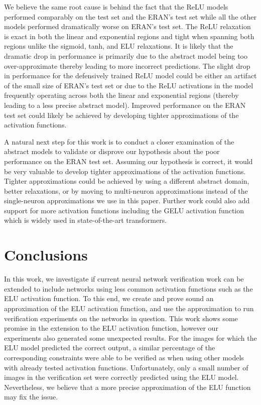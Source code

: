 \documentclass{llncs}
\begin{document}
We believe the same root cause is behind the fact that the ReLU models performed comparably on the test set and the ERAN's test set while all the other models performed dramatically worse on ERAN's test set.
The ReLU relaxation is exact in both the linear and exponential regions and tight when spanning both regions unlike the sigmoid, tanh, and ELU relaxations.
It is likely that the dramatic drop in performance is primarily due to the abstract model being too over-approximate thereby leading to more incorrect predictions.
The slight drop in performance for the defensively trained ReLU model could be either an artifact of the small size of ERAN's test set or due to the ReLU activations in the model frequently operating across both the linear and exponential regions (thereby leading to a less precise abstract model).
Improved performance on the ERAN test set could likely be achieved by developing tighter approximations of the activation functions.

A natural next step for this work is to conduct a closer examination of the abstract models to validate or disprove our hypothesis about the poor performance on the ERAN test set.
Assuming our hypothesis is correct, it would be very valuable to develop tighter approximations of the activation functions.
Tighter approximations could be achieved by using a different abstract domain, better relaxations, or by moving to multi-neuron approximations instead of the single-neuron approximations we use in this paper.
Further work could also add support for more activation functions including the GELU activation function which is widely used in state-of-the-art transformers.

\section{Conclusions}
In this work, we investigate if current neural network verification work can be extended to include networks using less common activation functions such as the ELU activation function.
To this end, we create and prove sound an approximation of the ELU activation function, and use the approximation to run verification experiments on the networks in question.
This work shows some promise in the extension to the ELU activation function, however our experiments also generated some unexpected results.
For the images for which the ELU model predicted the correct output, a similar percentage of the corresponding constraints were able to be verified as when using other models with already tested activation functions.
Unfortunately, only a small number of images in the verification set were correctly predicted using the ELU model.
Nevertheless, we believe that a more precise approximation of the ELU function may fix the issue.
\end{document}
